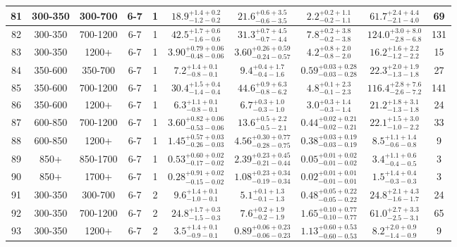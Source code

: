 \documentclass[11pt, oneside]{article}
\begin{document}
\begin{table}
{\begin{tabular}{ |c|c|c|c|c||c|c|c||c|c| }
81 & 300-350 & 300-700 & 6-7 & 1 & $18.9^{+1.4+0.2}_{-1.2-0.2}$ & $21.6^{+0.6+3.5}_{-0.6-3.5}$ & $2.2^{+0.2+1.1}_{-0.2-1.1}$ & $61.7^{+2.4+4.4}_{-2.1-4.0}$ & 69 \\ \hline
82 & 300-350 & 700-1200 & 6-7 & 1 & $42.5^{+1.7+0.6}_{-1.6-0.6}$ & $31.3^{+0.7+4.5}_{-0.7-4.4}$ & $7.8^{+0.2+3.8}_{-0.2-3.8}$ & $124.0^{+3.0+8.0}_{-2.8-6.8}$ & 131 \\ \hline
83 & 300-350 & 1200+ & 6-7 & 1 & $3.90^{+0.79+0.06}_{-0.48-0.06}$ & $3.60^{+0.26+0.59}_{-0.24-0.57}$ & $4.2^{+0.8+2.0}_{-0.8-2.0}$ & $16.2^{+1.6+2.2}_{-1.2-2.2}$ & 15 \\ \hline
84 & 350-600 & 350-700 & 6-7 & 1 & $7.2^{+1.4+0.1}_{-0.8-0.1}$ & $9.4^{+0.4+1.7}_{-0.4-1.6}$ & $0.59^{+0.03+0.28}_{-0.03-0.28}$ & $22.3^{+2.0+1.9}_{-1.3-1.8}$ & 27 \\ \hline
85 & 350-600 & 700-1200 & 6-7 & 1 & $30.4^{+1.5+0.4}_{-1.4-0.4}$ & $44.6^{+0.9+6.3}_{-0.8-6.2}$ & $4.8^{+0.1+2.3}_{-0.1-2.3}$ & $116.4^{+2.8+7.6}_{-2.6-7.2}$ & 141 \\ \hline
86 & 350-600 & 1200+ & 6-7 & 1 & $6.3^{+1.1+0.1}_{-0.8-0.1}$ & $6.7^{+0.3+1.0}_{-0.3-1.0}$ & $3.0^{+0.3+1.4}_{-0.3-1.4}$ & $21.2^{+1.8+3.1}_{-1.3-1.8}$ & 24 \\ \hline
87 & 600-850 & 700-1200 & 6-7 & 1 & $3.60^{+0.82+0.06}_{-0.53-0.06}$ & $13.6^{+0.5+2.2}_{-0.5-2.1}$ & $0.44^{+0.02+0.21}_{-0.02-0.21}$ & $22.1^{+1.5+3.0}_{-1.0-2.2}$ & 33 \\ \hline
88 & 600-850 & 1200+ & 6-7 & 1 & $1.45^{+0.57+0.03}_{-0.26-0.03}$ & $4.56^{+0.30+0.77}_{-0.28-0.75}$ & $0.38^{+0.03+0.19}_{-0.03-0.19}$ & $8.5^{+1.1+1.4}_{-0.6-0.8}$ & 9 \\ \hline
89 & 850+ & 850-1700 & 6-7 & 1 & $0.53^{+0.60+0.02}_{-0.17-0.02}$ & $2.39^{+0.23+0.45}_{-0.21-0.44}$ & $0.05^{+0.01+0.02}_{-0.01-0.02}$ & $3.4^{+1.1+0.6}_{-0.4-0.5}$ & 3 \\ \hline
90 & 850+ & 1700+ & 6-7 & 1 & $0.28^{+0.91+0.02}_{-0.15-0.02}$ & $1.08^{+0.23+0.34}_{-0.19-0.34}$ & $0.02^{+0.01+0.01}_{-0.01-0.01}$ & $1.5^{+1.4+0.4}_{-0.3-0.3}$ & 3 \\ \hline
91 & 300-350 & 300-700 & 6-7 & 2 & $9.6^{+1.4+0.1}_{-1.0-0.1}$ & $5.1^{+0.1+1.3}_{-0.1-1.3}$ & $0.48^{+0.05+0.22}_{-0.05-0.22}$ & $24.8^{+2.1+4.3}_{-1.6-1.7}$ & 24 \\ \hline
92 & 300-350 & 700-1200 & 6-7 & 2 & $24.8^{+1.7+0.3}_{-1.5-0.3}$ & $7.6^{+0.2+1.9}_{-0.2-1.9}$ & $1.65^{+0.10+0.77}_{-0.10-0.77}$ & $61.0^{+2.7+3.3}_{-2.5-3.1}$ & 65 \\ \hline
93 & 300-350 & 1200+ & 6-7 & 2 & $3.5^{+1.4+0.1}_{-0.9-0.1}$ & $0.89^{+0.06+0.23}_{-0.06-0.23}$ & $1.13^{+0.60+0.53}_{-0.60-0.53}$ & $8.2^{+2.0+0.9}_{-1.4-0.9}$ & 9 \\ \hline

\end{tabular}}
\end{table}
\end{document}
